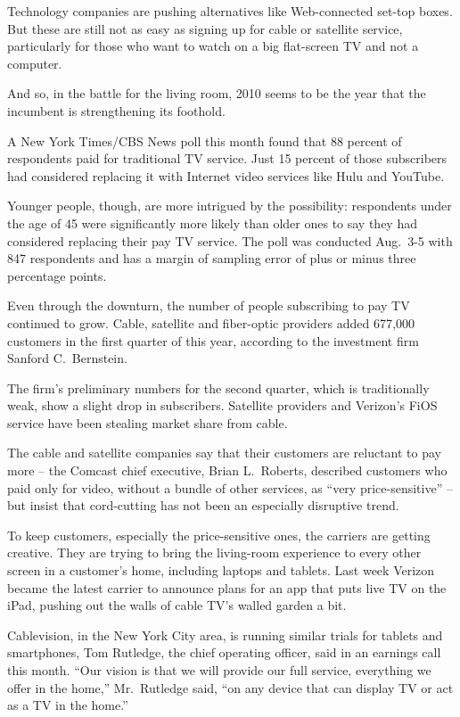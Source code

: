 ﻿\documentclass[12pt]{article}
\begin{document}
Technology companies are pushing alternatives like Web-connected set-top boxes. But these are still
not as easy as signing up for cable or satellite service, particularly for those who want to watch
on a big flat-screen TV and not a computer.

And so, in the battle for the living room, 2010 seems to be the year that the incumbent is
strengthening its foothold.

A New York Times/CBS News poll this month found that 88 percent of respondents paid for traditional
TV service. Just 15 percent of those subscribers had considered replacing it with Internet video
services like Hulu and YouTube.

Younger people, though, are more intrigued by the possibility: respondents under the age of 45 were
significantly more likely than older ones to say they had considered replacing their pay TV service.
The poll was conducted Aug.~3-5 with 847 respondents and has a margin of sampling error of plus or
minus three percentage points.

Even through the downturn, the number of people subscribing to pay TV continued to grow. Cable,
satellite and fiber-optic providers added 677,000 customers in the first quarter of this year,
according to the investment firm Sanford C.~Bernstein.

The firm's preliminary numbers for the second quarter, which is traditionally weak, show a slight
drop in subscribers. Satellite providers and Verizon's FiOS service have been stealing market share
from cable.

The cable and satellite companies say that their customers are reluctant to pay more -- the Comcast
chief executive, Brian L.~Roberts, described customers who paid only for video, without a bundle of
other services, as ``very price-sensitive'' -- but insist that cord-cutting has not been an
especially disruptive trend.

To keep customers, especially the price-sensitive ones, the carriers are getting creative. They are
trying to bring the living-room experience to every other screen in a customer's home, including
laptops and tablets. Last week Verizon became the latest carrier to announce plans for an app that
puts live TV on the iPad, pushing out the walls of cable TV's walled garden a bit.

Cablevision, in the New York City area, is running similar trials for tablets and smartphones, Tom
Rutledge, the chief operating officer, said in an earnings call this month. ``Our vision is that we
will provide our full service, everything we offer in the home,'' Mr.~Rutledge said, ``on any device
that can display TV or act as a TV in the home.''
\end{document}
